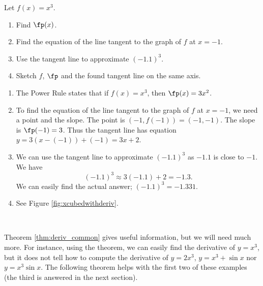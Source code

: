 {Let $f(x)=x^3$. 

		\begin{enumerate}
		\item		Find $\fp(x)$.
		\item		Find the equation of the line tangent to the graph of $f$ at $x=-1$. 
		\item		Use the tangent line to approximate $(-1.1)^3$.
		\item		Sketch $f$, $\fp$ and the found tangent line on the same axis.
		\end{enumerate}
}
{	\begin{enumerate}
\enlargethispage{\baselineskip}
		\item		The Power Rule states that if $f(x) = x^3$, then $\fp(x) = 3x^2$. 

		\item		To find the equation of the line tangent to the graph of $f$ at $x=-1$, we need a point and the slope. The point is $(-1,f(-1)) = (-1, -1)$. The slope is $\fp(-1)= 3$. Thus the tangent line has equation $y = 3(x-(-1))+(-1) = 3x+2$. 
		
		\item		We can use the tangent line to approximate $(-1.1)^3$ as $-1.1$ is close to $-1$. We have $$(-1.1)^3 \approx 3(-1.1)+2 = -1.3.$$
			We can easily find the actual answer; $(-1.1)^3 = -1.331$. 
		
		\item		See Figure \ref{fig:xcubedwithderiv}.
		\end{enumerate}
\baselineskip
}\\
\clearpage

Theorem \ref{thm:deriv_common} gives useful information, but we will need much more. For instance, using the theorem, we can easily find the derivative of $y=x^3$, but it does not tell how to compute the derivative of $y=2x^3$, $y=x^3+\sin x$ nor $y=x^3\sin x$. The following theorem helps with the first two of these examples (the third is answered in the next section).
\enlargethispage{\baselineskip}

